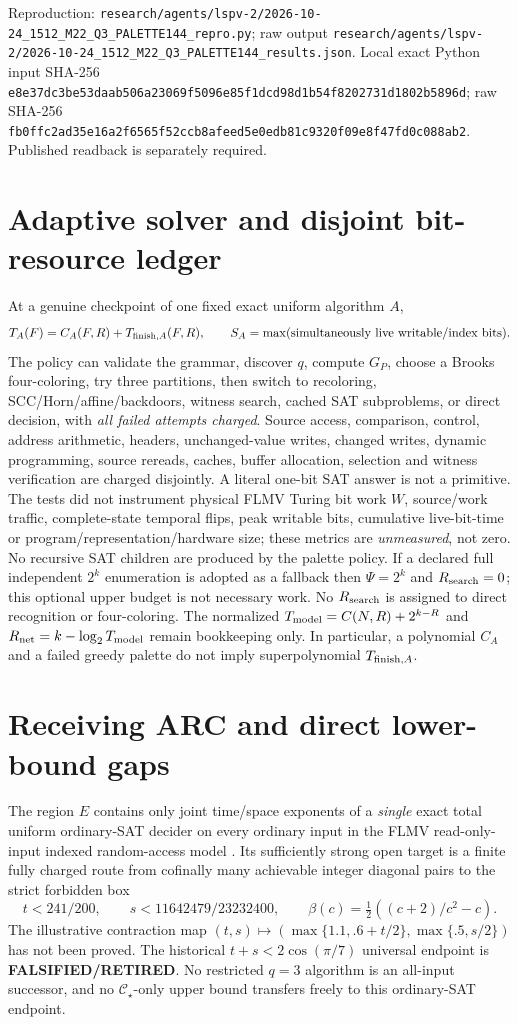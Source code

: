 \documentclass[11pt]{article}
\newcommand{\CS}{\mathcal C_{\star}}
\begin{document}
Reproduction: \texttt{research/agents/lspv-2/2026-10-24\_1512\_M22\_Q3\_PALETTE144\_repro.py}; raw output \texttt{research/agents/lspv-2/2026-10-24\_1512\_M22\_Q3\_PALETTE144\_results.json}. Local exact Python input SHA-256 \texttt{e8e37dc3be53daab506a23069f5096e85f1dcd98d1b54f8202731d1802b5896d}; raw SHA-256 \texttt{fb0ffc2ad35e16a2f6565f52ccb8afeed5e0edb81c9320f09e8f47fd0c088ab2}. Published readback is separately required.

\section{Adaptive solver and disjoint bit-resource ledger}
At a genuine checkpoint of one fixed exact uniform algorithm \(A\),
\[
 T_A(F)=C_A(F,R)+T_{{\rm finish},A}(F,R),\qquad
 S_A=\max(\hbox{simultaneously live writable/index bits}).
\]
The policy can validate the grammar, discover \(q\), compute \(G_P\), choose a Brooks four-coloring, try three partitions, then switch to recoloring, SCC/Horn/affine/backdoors, witness search, cached SAT subproblems, or direct decision, with \emph{all failed attempts charged}. Source access, comparison, control, address arithmetic, headers, unchanged-value writes, changed writes, dynamic programming, source rereads, caches, buffer allocation, selection and witness verification are charged disjointly. A literal one-bit SAT answer is not a primitive. The tests did not instrument physical FLMV Turing bit work \(W\), source/work traffic, complete-state temporal flips, peak writable bits, cumulative live-bit-time or program/representation/hardware size; these metrics are \emph{unmeasured}, not zero. No recursive SAT children are produced by the palette policy. If a declared full independent \(2^k\) enumeration is adopted as a fallback then \(\Psi=2^k\) and \(R_{\rm search}=0\); this optional upper budget is not necessary work. No \(R_{\rm search}\) is assigned to direct recognition or four-coloring. The normalized \(T_{\rm model}=C(N,R)+2^{k-R}\) and \(R_{\rm net}=k-\log_2T_{\rm model}\) remain bookkeeping only. In particular, a polynomial \(C_A\) and a failed greedy palette do not imply superpolynomial \(T_{{\rm finish},A}\).

\section{Receiving ARC and direct lower-bound gaps}
The region \(E\) contains only joint time/space exponents of a \emph{single} exact total uniform ordinary-SAT decider on every ordinary input in the FLMV read-only-input indexed random-access model \cite{flmv}. Its sufficiently strong open target is a finite fully charged route from cofinally many achievable integer diagonal pairs to the strict forbidden box
\[
 t<241/200,\qquad s<11642479/23232400,\qquad
 \beta(c)=\tfrac12((c+2)/c^2-c).
\]
The illustrative contraction map \((t,s)\mapsto(\max\{1.1,.6+t/2\},\max\{.5,s/2\})\) has not been proved. The historical \(t+s<2\cos(\pi/7)\) universal endpoint is \textbf{FALSIFIED/RETIRED}. No restricted \(q=3\) algorithm is an all-input successor, and no \(\CS\)-only upper bound transfers freely to this ordinary-SAT endpoint.
\end{document}
